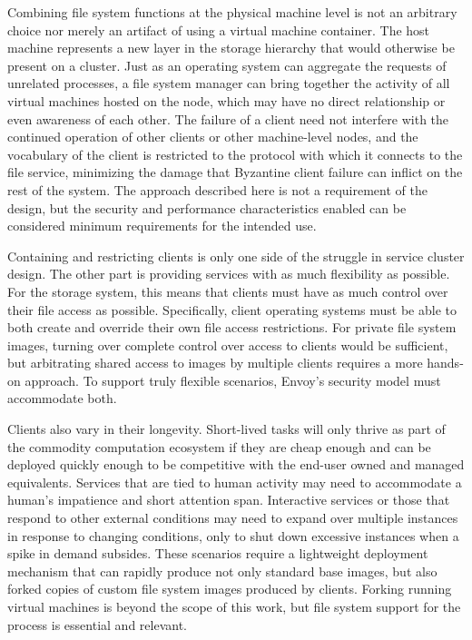 Combining file system functions at the physical machine level is not an arbitrary choice nor merely an artifact of using a virtual machine container. The host machine represents a new layer in the storage hierarchy that would otherwise be present on a cluster. Just as an operating system can aggregate the requests of unrelated processes, a file system manager can bring together the activity of all virtual machines hosted on the node, which may have no direct relationship or even awareness of each other. The failure of a client need not interfere with the continued operation of other clients or other machine-level nodes, and the vocabulary of the client is restricted to the protocol with which it connects to the file service, minimizing the damage that Byzantine client failure can inflict on the rest of the system. The approach described here is not a requirement of the design, but the security and performance characteristics enabled can be considered minimum requirements for the intended use.

Containing and restricting clients is only one side of the struggle in service cluster design. The other part is providing services with as much flexibility as possible. For the storage system, this means that clients must have as much control over their file access as possible. Specifically, client operating systems must be able to both create and override their own file access restrictions. For private file system images, turning over complete control over access to clients would be sufficient, but arbitrating shared access to images by multiple clients requires a more hands-on approach. To support truly flexible scenarios, Envoy's security model must accommodate both.

Clients also vary in their longevity. Short-lived tasks will only thrive as part of the commodity computation ecosystem if they are cheap enough and can be deployed quickly enough to be competitive with the end-user owned and managed equivalents. Services that are tied to human activity may need to accommodate a human's impatience and short attention span. Interactive services or those that respond to other external conditions may need to expand over multiple instances in response to changing conditions, only to shut down excessive instances when a spike in demand subsides. These scenarios require a lightweight deployment mechanism that can rapidly produce not only standard base images, but also forked copies of custom file system images produced by clients. Forking running virtual machines is beyond the scope of this work, but file system support for the process is essential and relevant.

